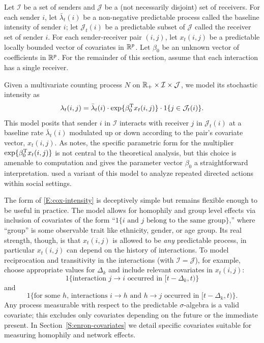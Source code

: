 \documentclass[final]{statsoc}
\begin{document}
Let $\mathcal{I}$ be a set of senders and $\mathcal{J}$ be a (not necessarily disjoint) set of receivers.
For each sender $i$, let $\bar \lambda_t(i)$ be a non-negative predictable
process called the baseline intensity of sender $i$; let $\mathcal{J}_t(i)$ be
a predictable subset of $\mathcal{J}$ called the receiver set of sender $i$.
For each sender-receiver pair $(i,j)$, let $x_t(i,j)$ be a predictable
locally bounded vector of covariates in $\mathbb{R}^p$.  Let $\beta_0$
be an unknown vector of coefficients in  $\mathbb{R}^p$.  For the remainder of
this section, assume that each interaction has a single receiver.

Given a multivariate counting process $N$ on
$\mathbb{R}_+ \times \mathcal{I} \times \mathcal{J}$,
we model its stochastic intensity as
\begin{equation}\label{E:cox-intensity}
    \lambda_t(i,j)
        =
        \bar \lambda_t(i)
        \cdot
        \exp\{ \beta_0^{\mathrm{T}} x_t(i, j) \}
        \cdot
        1{\{j \in \mathcal{J}_t(i)\}}.
\end{equation}
This model posits that sender $i$ in $\mathcal{I}$ interacts  with receiver $j$
in $\mathcal{J}_t(i)$ at a baseline rate $\bar \lambda_t(i)$ modulated up or
down according to the pair's covariate vector, $x_t(i,j)$.  As
\citet{efron1977efficiency} notes, the specific parametric form for the multiplier
$\exp\{ \beta_0^{\mathrm{T}} x_t(i,j) \}$ is not central to the theoretical
analysis, but this choice is amenable to computation and gives
the parameter vector $\beta_0$ a straightforward interpretation.
\citet{butts2008relational} used a variant of this model to analyze
repeated directed actions within social settings.

The form of \eqref{E:cox-intensity} is deceptively simple but remains
flexible enough to be useful in practice.  The model allows for
homophily and group level effects via inclusion of covariates of the form
``$1\{\text{$i$ and $j$ belong to the same group}\}$,'' where ``group'' is
some observable trait like ethnicity, gender, or age group.  Its real
strength, though, is that $x_t(i,j)$ is allowed to be \emph{any}
predictable process, in particular $x_t(i,j)$ can depend on the history
of interactions.  To model reciprocation and transitivity in the
interactions  (with $\mathcal{I} = \mathcal{J}$), for example, choose appropriate
values for $\Delta_k$ and include relevant covariates in $x_t(i,j)$:
\[
    1\{\text{interaction $j \to i$ occurred in $[t - \Delta_k,t)$}\}
\]
and
\[
    1\{\text{for some $h$, interactions $i\to h$ and $h \to j$ occurred in
             $[t - \Delta_k, t)$}\}.
\]
Any process measurable with respect to the predictable $\sigma$-algebra is
a valid covariate; this excludes only covariates depending on the future
or the immediate present.  In
Section~\ref{S:enron-covariates} we detail specific covariates suitable for
measuring homophily and network effects.
\end{document}
